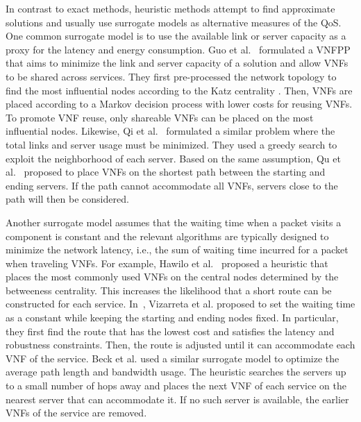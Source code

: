 In contrast to exact methods, heuristic methods attempt to find approximate solutions and usually use surrogate models as alternative measures of the QoS. One common surrogate model is to use the available link or server capacity as a proxy for the latency and energy consumption. Guo et al.~\cite{GuoWLQA0Y20} formulated a VNFPP that aims to minimize the link and server capacity of a solution and allow VNFs to be shared across services. They first pre-processed the network topology to find the most influential nodes according to the Katz centrality \cite{Katz53}. Then, VNFs are placed according to a Markov decision process with lower costs for reusing VNFs. To promote VNF reuse, only shareable VNFs can be placed on the most influential nodes. Likewise, Qi et al.~\cite{QiSW19} formulated a similar problem where the total links and server usage must be minimized. They used a greedy search to exploit the neighborhood of each server. Based on the same assumption, Qu et al.~\cite{QuASK17} proposed to place VNFs on the shortest path between the starting and ending servers. If the path cannot accommodate all VNFs, servers close to the path will then be considered.

Another surrogate model assumes that the waiting time when a packet visits a component is constant and the relevant algorithms are typically designed to minimize the network latency, i.e., the sum of waiting time incurred for a packet when traveling VNFs. For example, Hawilo et al.~\cite{HawiloJS19} proposed a heuristic that places the most commonly used VNFs on the central nodes determined by the betweeness centrality. This increases the likelihood that a short route can be constructed for each service. In~\cite{VizarretaCMMK17}, Vizarreta et al. proposed to set the waiting time as a constant while keeping the starting and ending nodes fixed. In particular, they first find the route that has the lowest cost and satisfies the latency and robustness constraints. Then, the route is adjusted until it can accommodate each VNF of the service. Beck et al. \cite{BeckB15} used a similar surrogate model to optimize the average path length and bandwidth usage. The heuristic searches the servers up to a small number of hops away and places the next VNF of each service on the nearest server that can accommodate it. If no such server is available, the earlier VNFs of the service are removed.

